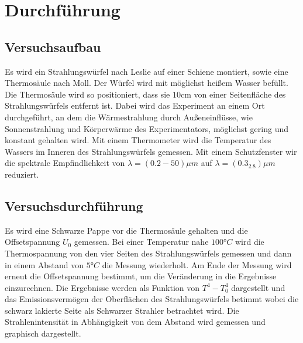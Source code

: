 \section{Durchführung}
\label{sec:Durchführung}
\subsection{Versuchsaufbau}
Es wird ein Strahlungswürfel nach Leslie auf einer Schiene montiert, sowie eine
Thermosäule nach Moll. Der Würfel wird mit möglichst heißem Wasser befüllt. Die
Thermosäule wird so positioniert, dass sie $10\si{\centi\meter}$ von einer
Seitenfläche des Strahlungswürfels entfernt ist. Dabei wird das Experiment an
einem Ort durchgeführt, an dem die Wärmestrahlung durch Außeneinflüsse, wie
Sonnenstrahlung und Körperwärme des Experimentators, möglichst gering und konstant
gehalten wird. Mit einem Thermometer wird die Temperatur des Wassers im Inneren
des Strahlungswürfels gemessen. Mit einem Schutzfenster wir die spektrale
Empfindlichkeit von $\lambda=(0.2-50)\mu m$ auf $\lambda=(0.3_2.8)\mu m$ reduziert.


\subsection{Versuchsdurchführung}
Es wird eine Schwarze Pappe vor die Thermosäule gehalten und die Offsetspannung
$U_0$ gemessen.
Bei einer Temperatur nahe $100°C$ wird die Thermospannung von den vier
Seiten des Strahlungswürfels gemessen und dann in einem Abstand von $5°C$ die
Messung wiederholt. Am Ende der Messung wird erneut die Offsetspannung bestimmt,
um die Veränderung in die Ergebnisse einzurechnen. Die Ergebnisse werden als
Funktion von $T^4-T_0^4$ dargestellt und das Emissionsvermögen der Oberflächen
des Strahlungswürfels betimmt wobei die schwarz lakierte Seite als
Schwarzer Strahler betrachtet wird.
Die Strahlenintensität in Abhängigkeit von dem Abstand wird gemessen und
graphisch dargestellt.
